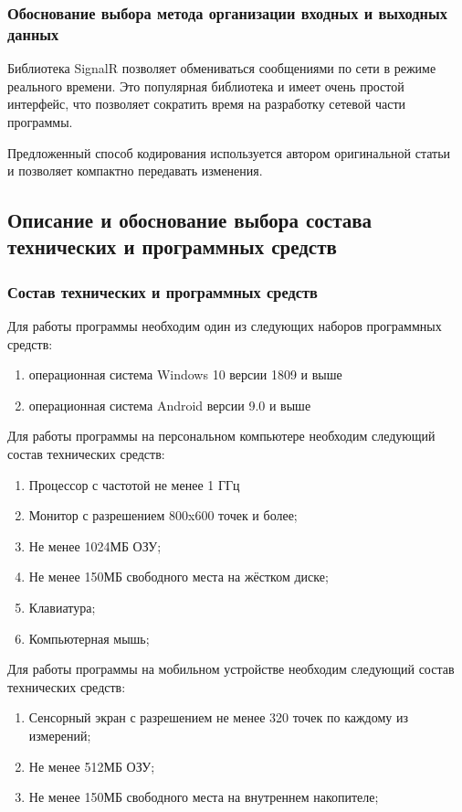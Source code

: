\documentclass[a4paper,12pt]{article}
\begin{document}
    \subsubsection{Обоснование выбора метода организации входных и выходных данных}
    Библиотека SignalR позволяет обмениваться сообщениями по сети в режиме реального времени. Это популярная библиотека и имеет очень простой интерфейс, что позволяет сократить время на разработку сетевой части программы.

    Предложенный способ кодирования используется автором оригинальной статьи~\cite{YATA} и позволяет компактно передавать изменения.

    \subsection{Описание и обоснование выбора состава технических и программных средств}

    \subsubsection{Состав технических и программных средств}
    Для работы программы необходим один из следующих наборов программных средств:
    \begin{enumerate}
        \item операционная система Windows 10 версии 1809 и выше
        \item операционная система Android версии 9.0 и выше
    \end{enumerate}

    Для работы программы на персональном компьютере необходим следующий состав технических средств:
    \begin{enumerate}
        \item Процессор с частотой не менее 1 ГГц
        \item Монитор с разрешением 800x600 точек и более;
        \item Не менее 1024МБ ОЗУ;
        \item Не менее 150МБ свободного места на жёстком диске;
        \item Клавиатура;
        \item Компьютерная мышь;
    \end{enumerate}

    Для работы программы на мобильном устройстве необходим следующий состав технических средств:
    \begin{enumerate}
        \item Сенсорный экран с разрешением не менее 320 точек по каждому из измерений;
        \item Не менее 512МБ ОЗУ;
        \item Не менее 150МБ свободного места на внутреннем накопителе;
    \end{enumerate}
\end{document}
